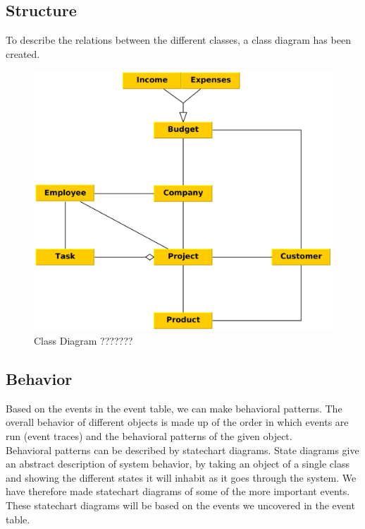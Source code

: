 \subsection{Structure}
To describe the relations between the different classes, a class diagram has been created.

\begin{figure}[H]
    \centering
    \includegraphics[scale=0.12]{Images/ProblemDomain/klassediagram.png}
    \caption{Class Diagram ???????}
    \label{fig:Class Diagram}
\end{figure}

\subsection{Behavior}

Based on the events in the event table, we can make behavioral patterns. The overall behavior of different objects is made up of the order in which events are run (event traces) and the behavioral patterns of the given object. %
\\
Behavioral patterns can be described by statechart diagrams. State diagrams give an abstract description of system behavior, by taking an object of a single class and showing the different states it will inhabit as it goes through the system.
We have therefore made statechart diagrams of some of the more important events. These statechart diagrams will be based on the events we uncovered in the event table.



